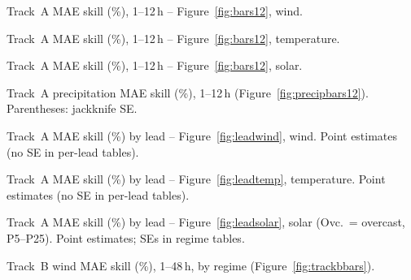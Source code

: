 \documentclass{article}
\newcommand{\numtable}[1]{%
  {\small\setlength{\tabcolsep}{6pt}\renewcommand{\arraystretch}{1.2}#1}%
}
\begin{document}
\begin{table}[htbp]
\centering
\caption{Track~A MAE skill (\%), 1--12\,h -- Figure~\ref{fig:bars12}, wind.}
\label{tab:skillshort}
\numtable{}
\end{table}

\begin{table}[htbp]
\centering
\caption{Track~A MAE skill (\%), 1--12\,h -- Figure~\ref{fig:bars12}, temperature.}
\label{tab:skillshorttemp}
\numtable{}
\end{table}

\begin{table}[htbp]
\centering
\caption{Track~A MAE skill (\%), 1--12\,h -- Figure~\ref{fig:bars12}, solar.}
\label{tab:skillshortsolar}
\numtable{}
\end{table}

\begin{table}[htbp]
\centering
\caption{Track~A precipitation MAE skill (\%), 1--12\,h
(Figure~\ref{fig:precipbars12}). Parentheses: jackknife SE.}
\label{tab:precipskillshort}
\numtable{\resizebox{\textwidth}{!}{}}
\end{table}

\begin{table}[htbp]
\centering
\caption{Track~A MAE skill (\%) by lead -- Figure~\ref{fig:leadwind}, wind.
Point estimates (no SE in per-lead tables).}
\label{tab:leadwind}
\numtable{}
\end{table}

\begin{table}[htbp]
\centering
\caption{Track~A MAE skill (\%) by lead -- Figure~\ref{fig:leadtemp}, temperature.
Point estimates (no SE in per-lead tables).}
\label{tab:leadtemp}
\numtable{}
\end{table}

\begin{table}[htbp]
\centering
\caption{Track~A MAE skill (\%) by lead -- Figure~\ref{fig:leadsolar}, solar
(Ovc.\ = overcast, P5--P25). Point estimates; SEs in regime tables.}
\label{tab:leadsolar}
\numtable{}
\end{table}

\begin{table}[htbp]
\centering
\caption{Track~B wind MAE skill (\%), 1--48\,h, by regime
(Figure~\ref{fig:trackbbars}).}
\label{tab:trackb}
\numtable{}
\end{table}
\end{document}
